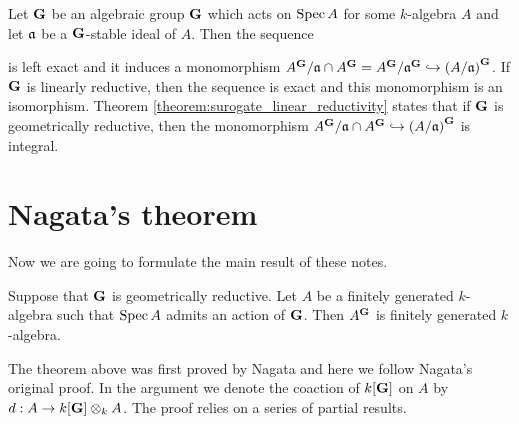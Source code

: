 \begin{remark}\label{remark:comment_on_surogate_linear_reductivity}
Let $\mathbf{G}$ be an algebraic group $\mathbf{G}$ which acts on $\mathrm{Spec}\, A$ for some $k$-algebra $A$ and let $\mathfrak{a}$ be a $\mathbf{G}$-stable ideal of $A$. Then the sequence
\begin{center}
\end{center}
is left exact and it induces a monomorphism $A^{\mathbf{G}}/\mathfrak{a}\cap A^{\mathbf{G}} = A^{\mathbf{G}}/\mathfrak{a}^{\mathbf{G}}\hookrightarrow \left(A/\mathfrak{a}\right)^{\mathbf{G}}$. If $\mathbf{G}$ is linearly reductive, then the sequence is exact and this monomorphism is an isomorphism. Theorem \ref{theorem:surogate_linear_reductivity} states that if $\mathbf{G}$ is geometrically reductive, then the monomorphism $A^{\mathbf{G}}/\mathfrak{a}\cap A^{\mathbf{G}} \hookrightarrow \left(A/\mathfrak{a}\right)^{\mathbf{G}}$ is integral.
\end{remark}

\section{Nagata's theorem}
\noindent
Now we are going to formulate the main result of these notes.

\begin{theorem}\label{theorem:Nagata_theorem_on_finite_generation_of_invariants}
Suppose that $\mathbf{G}$ is geometrically reductive. Let $A$ be a finitely generated $k$-algebra such that $\mathrm{Spec}\, A$ admits an action of $\mathbf{G}$. Then $A^{\mathbf{G}}$ is finitely generated $k$-algebra.
\end{theorem}
\noindent
The theorem above was first proved by Nagata and here we follow Nagata's original proof. In the argument we denote the coaction of $k[\mathbf{G}]$ on $A$ by $d:A\rightarrow k[\mathbf{G}]\otimes_kA$. The proof relies on a series of partial results.

